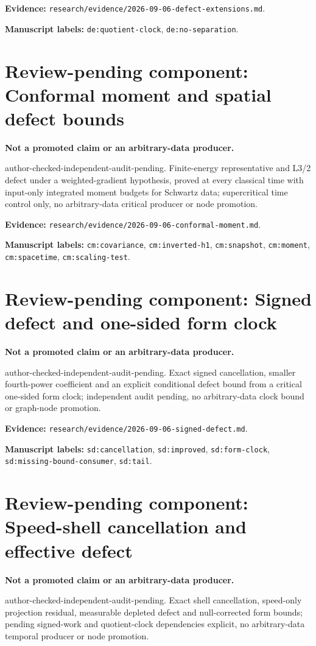 \documentclass[10pt]{article}
\begin{document}
\textbf{Evidence:} \texttt{research/evidence/2026-09-06-defect-extensions.md}.

\textbf{Manuscript labels:} \texttt{de:quotient-clock}, \texttt{de:no-separation}.
\clearpage\section*{Review-pending component: Conformal moment and spatial defect bounds}
\textbf{Not a promoted claim or an arbitrary-data producer.}

author-checked-independent-audit-pending. Finite-energy representative and L3/2 defect under a weighted-gradient hypothesis, proved at every classical time with input-only integrated moment budgets for Schwartz data; supercritical time control only, no arbitrary-data critical producer or node promotion.

\textbf{Evidence:} \texttt{research/evidence/2026-09-06-conformal-moment.md}.

\textbf{Manuscript labels:} \texttt{cm:covariance}, \texttt{cm:inverted-h1}, \texttt{cm:snapshot}, \texttt{cm:moment}, \texttt{cm:spacetime}, \texttt{cm:scaling-test}.
\clearpage\section*{Review-pending component: Signed defect and one-sided form clock}
\textbf{Not a promoted claim or an arbitrary-data producer.}

author-checked-independent-audit-pending. Exact signed cancellation, smaller fourth-power coefficient and an explicit conditional defect bound from a critical one-sided form clock; independent audit pending, no arbitrary-data clock bound or graph-node promotion.

\textbf{Evidence:} \texttt{research/evidence/2026-09-06-signed-defect.md}.

\textbf{Manuscript labels:} \texttt{sd:cancellation}, \texttt{sd:improved}, \texttt{sd:form-clock}, \texttt{sd:missing-bound-consumer}, \texttt{sd:tail}.
\clearpage\section*{Review-pending component: Speed-shell cancellation and effective defect}
\textbf{Not a promoted claim or an arbitrary-data producer.}

author-checked-independent-audit-pending. Exact shell cancellation, speed-only projection residual, measurable depleted defect and null-corrected form bounds; pending signed-work and quotient-clock dependencies explicit, no arbitrary-data temporal producer or node promotion.
\end{document}

